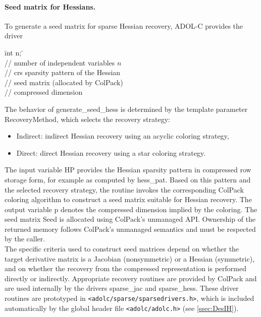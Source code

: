 \documentclass[11pt,twoside]{article}
\begin{document}
\paragraph{Seed matrix for Hessians.}
To generate a seed matrix for sparse Hessian recovery, ADOL-C provides
the driver
\begin{tabbing}
\hspace{0.5in}\={\sf int n;} \hspace{1.3in}\= \kill
{}\\
                 \> // number of independent variables $n$ \\
   \> // crs sparsity pattern of the Hessian \\
        \> // seed matrix (allocated by ColPack) \\
                \> // compressed dimension \\
\end{tabbing}
%
The behavior of {\sf generate\_seed\_hess} is determined by the template
parameter {\sf RecoveryMethod}, which selects the recovery strategy:
\begin{itemize}
  \item {\sf Indirect}: indirect Hessian recovery using an acyclic
        coloring strategy,
  \item {\sf Direct}: direct Hessian recovery using a star coloring
        strategy.
\end{itemize}
%
The input variable {\sf HP} provides the Hessian sparsity pattern in
compressed row storage form, for example as computed by {\sf hess\_pat}.
Based on this pattern and the selected recovery strategy, the routine
invokes the corresponding ColPack coloring algorithm to construct a
seed matrix suitable for Hessian recovery.
%
The output variable {\sf p} denotes the compressed dimension implied by
the coloring.  The seed matrix {\sf Seed} is allocated using ColPack's
unmanaged API.  Ownership of the returned memory follows ColPack's
unmanaged semantics and must be respected by the caller.
\\

%
The specific criteria used to construct seed matrices depend on whether
the target derivative matrix is a Jacobian (nonsymmetric) or a Hessian
(symmetric), and on whether the recovery from the compressed
representation is performed directly or indirectly.  Appropriate
recovery routines are provided by ColPack and are used internally by
the drivers {\sf sparse\_jac} and {\sf sparse\_hess}.
%
These driver routines are prototyped in
\verb=<adolc/sparse/sparsedrivers.h>=, which is included automatically
by the global header file \verb=<adolc/adolc.h>= (see
\autoref{ssec:DesIH}).
%
\end{document}
